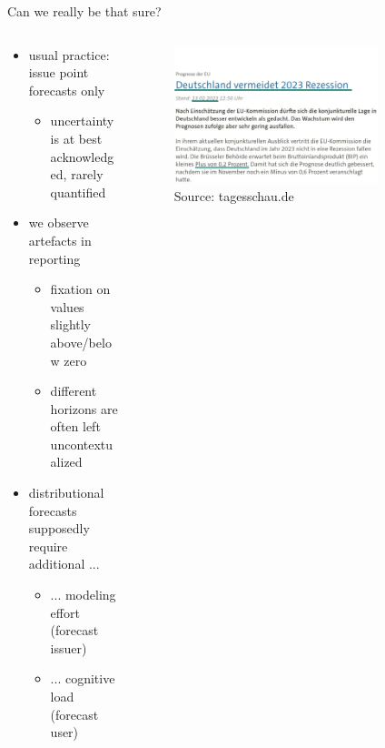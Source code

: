 \documentclass[en]{sdqbeamer}
\begin{document}
\begin{frame}[t]{Can we really be that sure?}

\begin{columns}
\begin{column}{0.45\textwidth}
   	\begin{itemize}
         \item usual practice: issue point forecasts only
         \begin{itemize}
	    \item uncertainty is at best acknowledged, rarely quantified \smallskip
	\end{itemize}
        \item we observe artefacts in reporting 
        \begin{itemize}
            \item fixation on values slightly above/below zero
            \item different horizons are often left uncontextualized \bigskip
        \end{itemize}
        \item distributional forecasts supposedly require additional ...
        \begin{itemize}
        \item ... modeling effort (forecast issuer)
        \item ... cognitive load (forecast user)
        \end{itemize}
    \end{itemize}
    \vspace{2cm}
\end{column}
\begin{column}{0.55\textwidth}
\vspace*{-2.05cm}
    \begin{figure}
        \centering
        \includegraphics[width=0.8\textwidth]{figures/recession_light_underlined_green_smaller_date.jpg} 
        \caption{Source: tagesschau.de}
        \label{fig:enter-label}
    \end{figure}     
\end{column}
\end{columns}
\end{frame}
\end{document}
